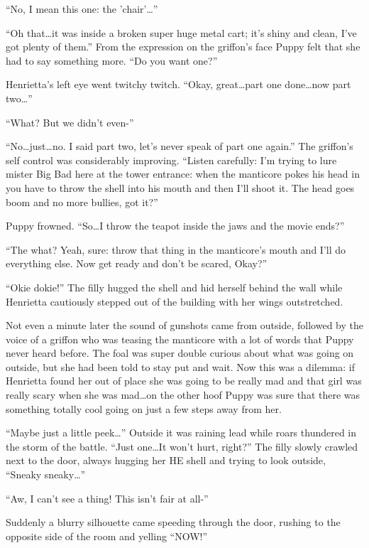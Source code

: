 ``No, I mean this one: the 'chair'\dots''

``Oh that\dots it was inside a broken super huge metal cart; it's shiny and clean, I've got plenty of them.'' From the expression on the griffon's face Puppy felt that she had to say something more. ``Do you want one?''

Henrietta's left eye went twitchy twitch. ``Okay, great\dots part one done\dots now part two\dots''

``What? But we didn't even-''

``No\dots just\dots no. I said part two, let's never speak of part one again.'' The griffon's self control was considerably improving. ``Listen carefully: I'm trying to lure mister Big Bad here at the tower entrance: when the manticore pokes his head in you have to throw the shell into his mouth and then I'll shoot it. The head goes boom and no more bullies, got it?''

Puppy frowned. ``So\dots I throw the teapot inside the jaws and the movie ends?''

``The what? Yeah, sure: throw that thing in the manticore's mouth and I'll do everything else. Now get ready and don't be scared, Okay?''

``Okie dokie!'' The filly hugged the shell and hid herself behind the wall while Henrietta cautiously stepped out of the building with her wings outstretched.

Not even a minute later the sound of gunshots came from outside, followed by the voice of a griffon who was teasing the manticore with a lot of words that Puppy never heard before. The foal was super double curious about what was going on outside, but she had been told to stay put and wait. Now this was a dilemma: if Henrietta found her out of place she was going to be really mad and that girl was really scary when she was mad\dots on the other hoof Puppy was sure that there was something totally cool going on just a few steps away from her.

``Maybe just a little peek\dots'' Outside it was raining lead while roars thundered in the storm of the battle. ``Just one\dots It won't hurt, right?'' The filly slowly crawled next to the door, always hugging her HE shell and trying to look outside, ``Sneaky sneaky\dots''

``Aw, I can't see a thing! This isn't fair at all-''

Suddenly a blurry silhouette came speeding through the door, rushing to the opposite side of the room and yelling ``NOW!''

